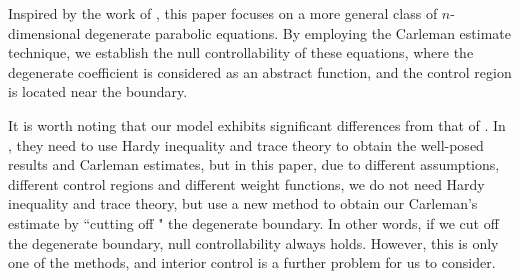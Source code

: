 \documentclass[9pt,reqno]{amsart}
\theoremstyle{plain}
\numberwithin{equation}{section}
\numberwithin{theorem}{section}
\begin{document}
	Inspired by the work of \cite{CA6}, this paper focuses on a more general class of $n$-dimensional degenerate parabolic equations. By employing the Carleman estimate technique, we establish the null controllability of these equations, where the degenerate coefficient is considered as an abstract function, and the control region is located near the boundary.
	
	It is worth noting that our model exhibits significant differences from that of \cite{CA6}. In \cite{CA6}, they need to use Hardy inequality and trace theory to obtain the well-posed results and Carleman estimates, but in this paper, due to different assumptions, different control regions and different weight functions, we do not need Hardy inequality and trace theory, but use a new method to obtain our Carleman's estimate by ``cutting off " the degenerate boundary. In other words, if we cut off the degenerate boundary, null controllability always holds. However, this is only one of the methods, and interior control is a further problem for us to consider.
	
\end{document}
